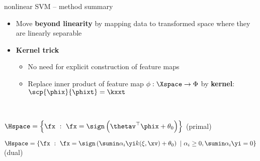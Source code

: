 \begin{frame}{nonlinear SVM -- method summary}

\footnotesize

   

\medskip

\begin{itemize}
  \item Move \textbf{beyond linearity} by mapping data to 
  transformed space where they are linearly separable
  \item \textbf{Kernel trick} %
  \begin{itemize}
    \item No need for explicit construction of feature maps
    \item Replace inner product of feature map $\phi: \Xspace \to \Phi$ by \textbf{kernel}: $\scp{\phix}{\phixt} = \kxxt$
  \end{itemize}
\end{itemize}


\medskip


 ~~

$\Hspace  = \left \{\fx ~:~ \fx = \sign \left( \thetav^\top \phix + \theta_0 \right) \right \}$ (primal)

$\Hspace  = \left \{\fx ~:~ \fx = \sign \left( \sumin \alpha_i \yi k(\xi, \xv) + \theta_0 \right) ~|~ \alpha_i \geq 0,  \sumin \alpha_i \yi = 0 \right \}$ (dual)%


\end{frame}
